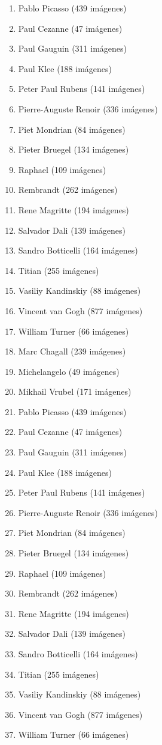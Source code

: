 \documentclass[../main.tex]{subfiles}
\begin{document}
\begin{enumerate}
    \item Pablo Picasso (439 imágenes)
    \item Paul Cezanne (47 imágenes)
    \item Paul Gauguin (311 imágenes)
    \item Paul Klee (188 imágenes)
    \item Peter Paul Rubens (141 imágenes)
    \item Pierre-Auguste Renoir (336 imágenes)
    \item Piet Mondrian (84 imágenes)
    \item Pieter Bruegel (134 imágenes)
    \item Raphael (109 imágenes)
    \item Rembrandt (262 imágenes)
    \item Rene Magritte (194 imágenes)
    \item Salvador Dali (139 imágenes)
    \item Sandro Botticelli (164 imágenes)
    \item Titian (255 imágenes)
    \item Vasiliy Kandinskiy (88 imágenes)
    \item Vincent van Gogh (877 imágenes)
    \item William Turner (66 imágenes)
    \item Marc Chagall (239 imágenes)
    \item Michelangelo (49 imágenes)
    \item Mikhail Vrubel (171 imágenes)
    \item Pablo Picasso (439 imágenes)
    \item Paul Cezanne (47 imágenes)
    \item Paul Gauguin (311 imágenes)
    \item Paul Klee (188 imágenes)
    \item Peter Paul Rubens (141 imágenes)
    \item Pierre-Auguste Renoir (336 imágenes)
    \item Piet Mondrian (84 imágenes)
    \item Pieter Bruegel (134 imágenes)
    \item Raphael (109 imágenes)
    \item Rembrandt (262 imágenes)
    \item Rene Magritte (194 imágenes)
    \item Salvador Dali (139 imágenes)
    \item Sandro Botticelli (164 imágenes)
    \item Titian (255 imágenes)
    \item Vasiliy Kandinskiy (88 imágenes)
    \item Vincent van Gogh (877 imágenes)
    \item William Turner (66 imágenes)
\end{enumerate}
\end{document}
